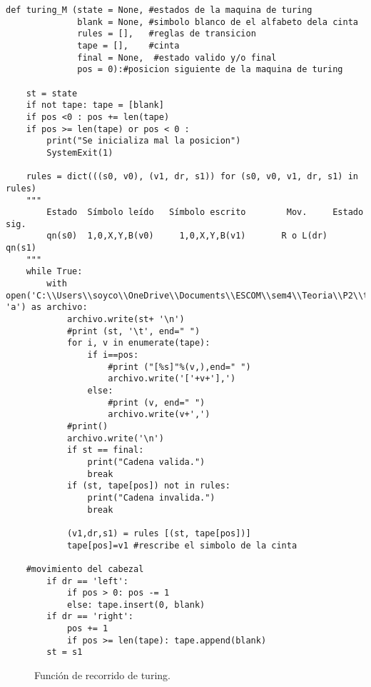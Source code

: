 \begin{lstlisting}
def turing_M (state = None, #estados de la maquina de turing
              blank = None, #simbolo blanco de el alfabeto dela cinta
              rules = [],   #reglas de transicion
              tape = [],    #cinta
              final = None,  #estado valido y/o final
              pos = 0):#posicion siguiente de la maquina de turing

    st = state
    if not tape: tape = [blank]
    if pos <0 : pos += len(tape)
    if pos >= len(tape) or pos < 0 : 
        print("Se inicializa mal la posicion")
        SystemExit(1)
    
    rules = dict(((s0, v0), (v1, dr, s1)) for (s0, v0, v1, dr, s1) in rules)
    """
        Estado	Símbolo leído	Símbolo escrito	       Mov. 	Estado sig.
        qn(s0)  1,0,X,Y,B(v0)	  1,0,X,Y,B(v1)       R o L(dr)	   qn(s1)
    """
    while True:
        with open('C:\\Users\\soyco\\OneDrive\\Documents\\ESCOM\\sem4\\Teoria\\P2\\turing\\output\\turing.txt', 'a') as archivo:
            archivo.write(st+ '\n')
            #print (st, '\t', end=" ")
            for i, v in enumerate(tape):
                if i==pos: 
                    #print ("[%s]"%(v,),end=" ")
                    archivo.write('['+v+'],')
                else: 
                    #print (v, end=" ")
                    archivo.write(v+',') 
            #print()
            archivo.write('\n')
            if st == final: 
                print("Cadena valida.")
                break
            if (st, tape[pos]) not in rules: 
                print("Cadena invalida.")
                break
            
            (v1,dr,s1) = rules [(st, tape[pos])]
            tape[pos]=v1 #rescribe el simbolo de la cinta
    
    #movimiento del cabezal
        if dr == 'left':
            if pos > 0: pos -= 1
            else: tape.insert(0, blank)
        if dr == 'right':
            pos += 1
            if pos >= len(tape): tape.append(blank)
        st = s1
\end{lstlisting}
\begin{figure}[h]
\begin{center}
\end{center}
\caption{Función de recorrido de turing.}
\label{fig:imagen}
\end{figure}
\newpage

